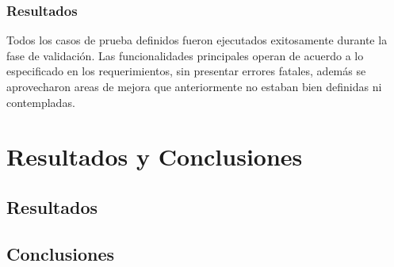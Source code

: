 \documentclass[12pt,letterpaper,spanish]{report}
\begin{document}
\subsection{Resultados}
Todos los casos de prueba definidos fueron ejecutados exitosamente durante la fase de validaci\'on. Las funcionalidades principales operan de acuerdo a lo especificado en los requerimientos, sin presentar errores fatales, además se aprovecharon areas de mejora que anteriormente no estaban bien definidas ni contempladas.






\chapter{Resultados y Conclusiones}
\newpage

\section{Resultados}


\section{Conclusiones}



\newpage

\appendix

\nocite{book}
\nocite{dura2022saas}
\nocite{pretell2024mejora}
\nocite{odooDocs}
\nocite{book}

%
%




\end{document}
